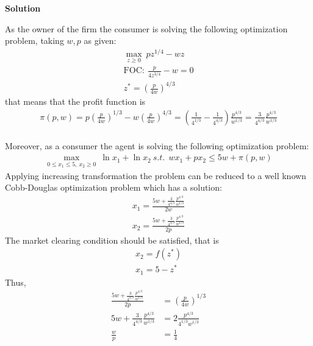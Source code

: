 \documentclass[a4paper]{article}
\begin{document}
\textbf{Solution}


As the owner of the firm the consumer is solving the following optimization problem, taking $w, p$ as given:
\begin{align*}
\underset{z \ge 0}{\max}\ pz^{1/4} - wz\\
\text{FOC}:\ \frac{p}{4z^{3/4}} - w = 0\\
z^* = \left(\frac{p}{4w}\right)^{4/3}
\end{align*}
that means that the profit function is
\begin{align*}
\pi(p, w) = p \left(\frac{p}{4w}\right)^{1/3} - w\left(\frac{p}{4w}\right)^{4/3} = \left(\frac{1}{4^{1/3}} - \frac{1}{4^{4/3}}\right) \frac{p^{4/3}}{w^{1/3}} = \frac{3}{4^{4/3}}\frac{p^{4/3}}{w^{1/3}}
\end{align*}\\
Moreover, as a consumer the agent is solving the following optimization problem:
\begin{align*}
\underset{0 \le x_1 \le 5,\ x_2 \ge 0}{\max}\ \ln x_1 + \ln x_2\ s.t.\ \ wx_1 + px_2 \le 5w + \pi(p, w)
\end{align*}
Applying increasing transformation the problem can be reduced to a well known Cobb-Douglas optimization problem which has a solution:
\begin{align*}
x_1 = \frac{5w + \frac{3}{4^{4/3}}\frac{p^{4/3}}{w^{1/3}}}{2w}\\
x_2 = \frac{5w + \frac{3}{4^{4/3}}\frac{p^{4/3}}{w^{1/3}}}{2p}
\end{align*}
The market clearing condition should be satisfied, that is
\begin{align*}
x_2 = f(z^*)\\
x_1 = 5 - z^*
\end{align*}
Thus, 
\begin{align*}
\frac{5w + \frac{3}{4^{4/3}}\frac{p^{4/3}}{w^{1/3}}}{2p} &= \left(\frac{p}{4w}\right)^{1/3}\\
5w + \frac{3}{4^{4/3}}\frac{p^{4/3}}{w^{1/3}} &= 2 \frac{p^{4/3}}{4^{1/3}w^{1/3}}\\
\frac{w}{p} &= \frac{1}{4}
\end{align*}
\end{document}
